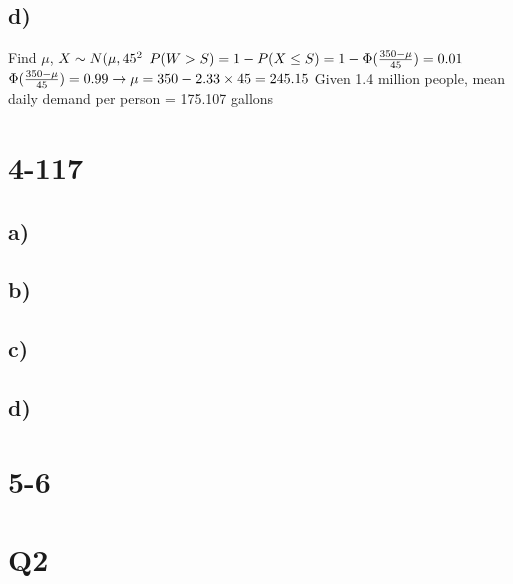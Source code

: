 \documentclass[
]{article}
\begin{document}
\hypertarget{d-2}{%
\subsection{d)}\label{d-2}}

Find \(\mu\), \(X \sim N(\mu,45^2\\\)
\(P(W>S)=1-P(X\le S) = 1 - \Phi(\frac{350-\mu}{45}) =0.01\\\)
\(\Phi(\frac{350-\mu}{45}) = 0.99 \rightarrow \mu = 350-2.33\times45=245.15\\\)
Given 1.4 million people, mean daily demand per person = 175.107 gallons

\hypertarget{section-4}{%
\section{4-117}\label{section-4}}

\hypertarget{a-3}{%
\subsection{a)}\label{a-3}}

\hypertarget{b-4}{%
\subsection{b)}\label{b-4}}

\hypertarget{c-3}{%
\subsection{c)}\label{c-3}}

\hypertarget{d-3}{%
\subsection{d)}\label{d-3}}

\hypertarget{section-5}{%
\section{5-6}\label{section-5}}

\hypertarget{q2}{%
\section{Q2}\label{q2}}
\end{document}
